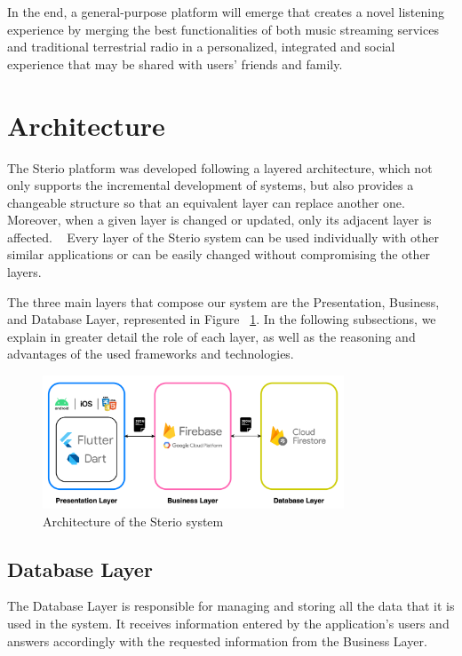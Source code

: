 In the end, a general-purpose platform will emerge that creates a novel listening experience by merging the best functionalities of both music streaming services and traditional terrestrial radio in a personalized, integrated and social experience that may be shared with users' friends and family.




\section{Architecture}

The Sterio platform was developed following a layered architecture, which not only supports the incremental development of systems, but also provides a changeable structure so that an equivalent layer can replace another one. Moreover, when a given layer is changed or updated, only its adjacent layer is affected. ~\cite{Aarsten} Every layer of the Sterio system can be used individually with other similar applications or can be easily changed without compromising the other layers. 

The three main layers that compose our system are the Presentation, Business, and Database Layer, represented in Figure ~\ref{fig:arc}. In the following subsections, we explain in greater detail the role of each layer, as well as the reasoning and advantages of the used frameworks and technologies. 

\begin{figure}[h]
\centering
\includegraphics[width=0.8\textwidth]{./Images/arc.png}
\caption{Architecture of the Sterio system}
\label{fig:arc}
\end{figure}

\subsection{Database Layer}

The Database Layer is responsible for managing and storing all the data that it is used in the system. It receives information entered by the application's users and answers accordingly with the requested information from the Business Layer. ~\cite{Aarsten}

